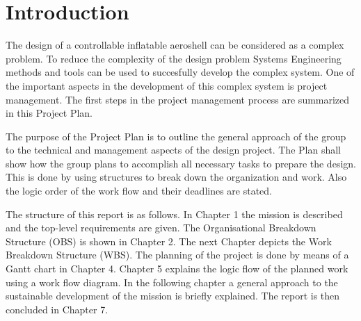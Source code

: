 \section{Introduction}\label{cha:introduction}
The design of a controllable inflatable aeroshell can be considered as a complex problem. To reduce the complexity of the design problem Systems Engineering methods and tools can be used to succesfully develop the complex system. One of the important aspects in the development of this complex system is project management. The first steps in the project management process are summarized in this Project Plan.

The purpose of the Project Plan is to outline the general approach of the group to the technical and management aspects of the design project. The Plan shall show how the group plans to accomplish all necessary tasks to prepare the design. This is done by using structures to break down the organization and work. Also the logic order of the work flow and their deadlines are stated.

The structure of this report is as follows. In Chapter 1 the mission is described and the top-level requirements are given. The Organisational Breakdown Structure (OBS) is shown in Chapter 2. The next Chapter depicts the Work Breakdown Structure (WBS). The planning of the project is done by means of a Gantt chart in Chapter 4. Chapter 5 explains the logic flow of the planned work using a work flow diagram. In the following chapter a general approach to the sustainable development of the mission is briefly explained. The report is then concluded in Chapter 7.